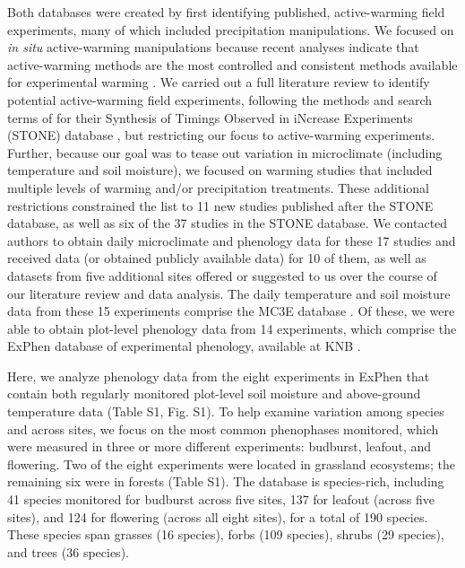 \documentclass{article}
\begin{document}
\par Both databases were created by first identifying published, active-warming field experiments, many of which included precipitation manipulations. We focused on \textit{in situ} active-warming manipulations because recent analyses indicate that active-warming methods are the most controlled and consistent methods available for experimental warming \citep{kimball2005,kimball2008,aronson2009,wolkovich2012a}. We carried out a full literature review to identify potential active-warming field experiments, following the methods and search terms of \citet{wolkovich2012a} for their Synthesis of Timings Observed in iNcrease Experiments (STONE) database \citep{wolkovich2012}, but restricting our focus to active-warming experiments. Further, because our goal was to tease out variation in microclimate (including temperature and soil moisture), we focused on warming studies that included multiple levels of warming and/or precipitation treatments. These additional restrictions constrained the list to 11 new studies published after the STONE database, as well as six of the 37 studies in the STONE database. We contacted authors to obtain daily microclimate and phenology data for these 17 studies and received data (or obtained publicly available data) for 10 of them, as well as datasets from five additional sites offered or suggested to us over the course of our literature review and data analysis. The daily temperature and soil moisture data from these 15 experiments comprise the MC3E database \citep{ettinger2018,ettinger2019}. Of these, we were able to obtain plot-level phenology data from 14 experiments, which comprise the ExPhen database of experimental phenology, available at KNB \citep{ettinger2022}. 

\par Here, we analyze phenology data from the eight experiments in ExPhen that contain both regularly monitored plot-level soil moisture and above-ground temperature data (Table S1, Fig. S1). To help examine variation among species and across sites, we focus on the most common phenophases monitored, which were measured in three or more different experiments: budburst, leafout, and flowering. Two of the eight experiments were located in grassland ecosystems; the remaining six were in forests (Table S1). The database is species-rich, including 41 species monitored for budburst across five sites, 137 for leafout (across five sites), and 124 for flowering (across all eight sites), for a total of 190 species. These species span grasses (16 species), forbs (109 species), shrubs (29 species), and trees (36 species). 
\end{document}
